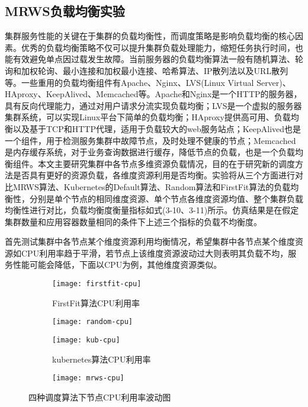 \subsection{MRWS负载均衡实验}
集群服务性能的关键在于集群的负载均衡性，而调度策略是影响负载均衡的核心因素。优秀的负载均衡策略不仅可以提升集群负载处理能力，缩短任务执行时间，也能有效避免单点因过载发生故障。当前服务器的负载均衡算法一般有随机算法、轮询和加权轮询、最小连接和加权最小连接、哈希算法、IP散列法以及URL散列等。一些重用的负载均衡组件有Apache、Nginx、LVS(Linux Virtual Server)、HAproxy、KeepAlived、Memcached等。Apache和Nginx是一个HTTP的服务器，具有反向代理能力，通过对用户请求分流实现负载均衡；LVS是一个虚拟的服务器集群系统，可以实现Linux平台下简单的负载均衡；HAproxy提供高可用、负载均衡以及基于TCP和HTTP代理，适用于负载较大的web服务站点；KeepAlived也是一个组件，用于检测服务集群中故障节点，及时处理不健康的节点；Memcached是内存缓存系统，对于业务查询数据进行缓存，降低节点的负载，也是一个负载均衡组件。本文主要研究集群中各节点多维资源负载情况，目的在于研究新的调度方法是否具有更好的资源负载，各维度资源利用是否均衡。实验将从三个方面进行对比MRWS算法、Kubernetes的Default算法、Random算法和FirstFit算法的负载均衡性，分别是单个节点的相同维度资源、单个节点各维度资源均值、整个集群负载均衡性进行对比，负载均衡度衡量指标如式(3-10、3-11)所示。仿真结果是在假定集群数量和应用容器数量相同的条件下上述三个指标的负载不均衡度。

首先测试集群中各节点某个维度资源利用均衡情况，希望集群中各节点某个维度资源如CPU利用率趋于平滑，若节点上该维度资源波动过大则表明其负载不均，服务性能可能会降低，下面以CPU为例，其他维度资源类似。
\begin{figure}[h]
	\centering%
	\begin{subfigure}{7cm}
		\texttt{[image: firstfit-cpu]}
		\caption{FirstFit算法CPU利用率}
	\end{subfigure}%
	\hspace{0.5cm}%
	\begin{subfigure}{7cm}
		\texttt{[image: random-cpu]}
	\end{subfigure}
	\begin{subfigure}{7cm}
		\texttt{[image: kub-cpu]}
		\caption{kubernetes算法CPU利用率}
	\end{subfigure}%
	\hspace{0.5cm}%
	\begin{subfigure}{7cm}
		\texttt{[image: mrws-cpu]}
	\end{subfigure}
	\caption{四种调度算法下节点CPU利用率波动图}
	
\end{figure}

